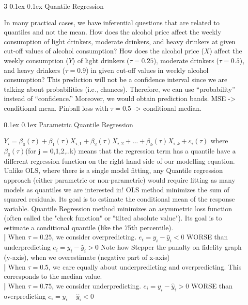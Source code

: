 \documentclass[8pt,landscape]{article}
\makeatletter
\renewcommand{\section}{\@startsection{section}{2}{0pt}%
    {0.1ex}%
    {0.1ex}%
    {\fontsize{8}{9}\bfseries\color{red}}} %
\renewcommand{\subsection}{\@startsection{subsection}{2}{0pt}%
    {0.1ex}%
    {0.1ex}%
    {\fontsize{8}{9}\bfseries\color{blue}}} %
\newcommand{\smalltext}[1]{
  {\fontsize{8}{9}\selectfont\sloppy #1\par}
}
\makeatother
\begin{document}
\begin{multicols}{3}
\section{Quantile Regression}
\smalltext{
  In many practical cases, we have inferential questions that are related to quantiles and not the mean.
  How does the alcohol price affect the weekly consumption of light drinkers, moderate drinkers, and heavy drinkers at given cut-off values of alcohol consumption?
  How does the alcohol price ($X$) affect the weekly consumption ($Y$) of light drinkers ($\tau = 0.25$), moderate drinkers ($\tau = 0.5$), and heavy drinkers ($\tau = 0.9$) in given cut-off values in weekly alcohol consumption?
  This prediction will not be a confidence interval since we are talking about probabilities (i.e., chances). Therefore, we can use “probability” instead of “confidence.” Moreover, we would obtain prediction bands.
  MSE -> conditional mean. Pinball loss with $\tau=0.5$ -> conditional median.
}

\subsection{Parametric Quantile Regression}
\smalltext{
$Y_i = \beta_0(\tau) + \beta_1(\tau)X_{i,1} + \beta_2(\tau)X_{i,2} + \dots + \beta_k(\tau)X_{i,k} + \varepsilon_i(\tau)$
where $\beta_0(\tau)$(for j = 0,1,2,..k) means that the regression term has a quantile have a different regression function on the right-hand side of our modelling equation.
Unlike OLS, where there is a single model fitting, any Quantile regression approach (either parametric or non-parametric) would require fitting as many models as quantiles we are interested in!
OLS method minimizes the sum of squared residuals. Its goal is to estimate the conditional mean of the response variable.
Quantile Regression method minimizes an asymmetric loss function (often called the "check function" or "tilted absolute value"). Its goal is to estimate a conditional quantile (like the 75th percentile). \\
| When  $\tau=0.25$, we consider overpredicting. $e_i = y_i - \hat{y}_i < 0$ WORSE than underpredicting $e_i = y_i - \hat{y}_i > 0$
Note how Stepper the panalty on fidelity graph (y-axis), when we overestimate (negative part of x-axis) \\
| When  $\tau=0.5$, we care equally about underpredicting and overpredicting. This corresponds to the median value. \\
| When $\tau=0.75$, we consider underpredicting. $e_i = y_i - \hat{y}_i > 0$ WORSE than overpredicting $e_i = y_i - \hat{y}_i < 0$
}


\end{multicols}
\end{document}
